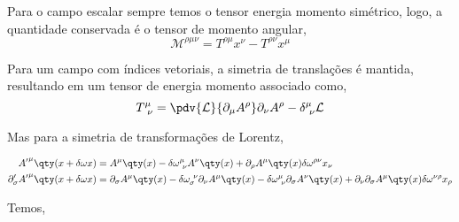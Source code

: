 \documentclass[twoside]{amsart}
\numberwithin{equation}{section}
\begin{document}
Para o campo escalar sempre temos o tensor energia momento simétrico, logo, a quantidade conservada é o tensor de momento angular, $$\mathcal M^{\rho\mu\nu}=T^{\rho\mu}x^\nu-T^{\rho\nu}x^\mu$$

Para um campo com índices vetoriais, a simetria de translações é mantida, resultando em um tensor de energia momento associado como, $$T^{\mu}_{\ \nu}=\pdv{\mathcal L}{\partial_\mu A^\rho}\partial_\nu A^\rho-\delta^{\mu}_{\ \nu}\mathcal L$$

Mas para a simetria de transformações de Lorentz, 

\begin{align}
    {A'}^\mu\qty(x+\delta \omega x)&=A^\mu\qty(x)-\delta\omega^{\mu}_{\ \nu}A^\nu\qty(x)+\partial_\rho A^\mu\qty(x)\delta\omega^{\rho \nu}x_\nu\\
    \partial_\sigma'{A'}^\mu\qty(x+\delta\omega x)&=\partial_\sigma A^\mu\qty(x)-\delta\omega_{\sigma}^{\ \nu}\partial_\nu A^\mu\qty(x)-\delta\omega^{\mu}_{\ \nu}\partial_\sigma A^\nu\qty(x)+\partial_\nu\partial_\sigma A^\mu\qty(x)\delta\omega^{\nu\rho}x_\rho
\end{align}

Temos,
\end{document}
